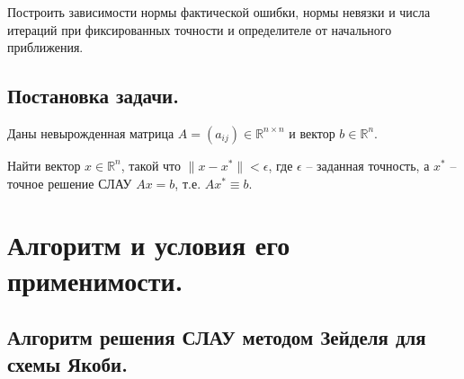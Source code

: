 \documentclass[a4paper, 12pt]{article}
\theoremstyle{definition}
\begin{document}
	Построить зависимости нормы фактической ошибки, нормы невязки и числа итераций при фиксированных точности и определителе от начального приближения.
	
	\subsection{Постановка задачи.}
	
	Даны невырожденная матрица $A=(a_{ij})\in \mathbb{R}^{n\times n}$ и вектор $b\in \mathbb{R}^n$.
	
	Найти вектор $x\in \mathbb{R}^n$, такой что $\|x-x^*\|<\epsilon$, где $\epsilon$ -- заданная точность, а $x^*$ -- точное решение СЛАУ $Ax=b$, т.е. $Ax^*\equiv b$.
	
	\section{Алгоритм и условия его применимости.}
	
	\subsection{Алгоритм решения СЛАУ методом Зейделя для схемы Якоби.}
	
\end{document}

